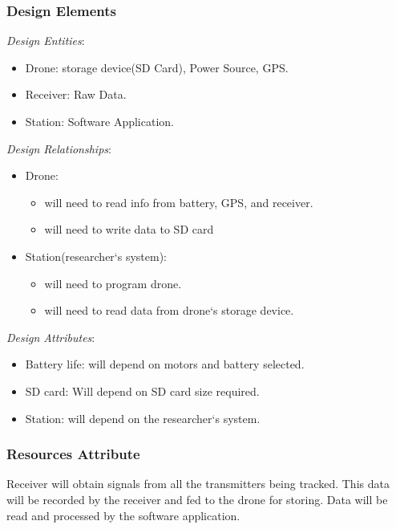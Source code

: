 \documentclass[onecolumn, draftclsnofoot,10pt, compsoc]{IEEEtran}
\begin{document}
\subsubsection{Design Elements}
\textit{Design Entities}:
\begin{itemize}
    \item Drone: storage device(SD Card), Power Source, GPS.
	\item Receiver: Raw Data.
	\item Station: Software Application.
\end{itemize}
\textit{Design Relationships}:
\begin{itemize}
    \item Drone: 
    \begin{itemize}
        \item will need to read info from battery, GPS, and receiver.
        \item will need to write data to SD card
    \end{itemize}
    \item Station(researcher`s system):
    \begin{itemize}
        \item will need to program drone.
        \item will need to read data from drone`s storage device.
    \end{itemize}
\end{itemize}


\textit{Design Attributes}: 
    \begin{itemize}
        \item Battery life: will depend on motors and battery selected.
        \item SD card: Will depend on SD card size required.
        \item Station: will depend on the researcher`s system.
    \end{itemize}

\subsubsection{Resources Attribute}

Receiver will obtain signals from all the transmitters being tracked. This data will be recorded by the receiver and fed to the drone for storing. Data will be read and processed by the software application.  
\end{document}
